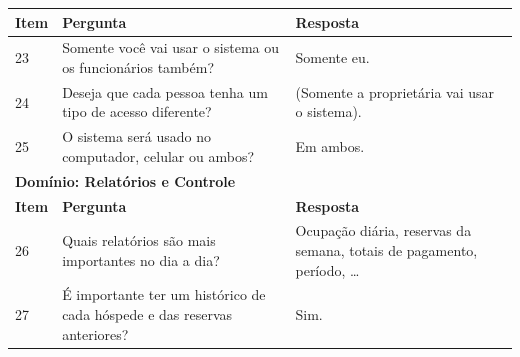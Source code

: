 \documentclass[
	12pt,				%
	openany,			%
	oneside,			%
	a4paper,			%
	english,			%
	french,				%
	spanish,			%
	brazil				%
	]{abntex2}
\begin{document}
\begin{apendicesenv}
\begin{quadro}[H]
\begin{tabular}{|p{1cm}|p{6.5cm}|p{6.5cm}|}
		\hline
		\textbf{Item} & \textbf{Pergunta} & \textbf{Resposta} \\ 
		\hline
		23 & Somente você vai usar o sistema ou os funcionários também? & Somente eu. \\
		\hline
		24 &  Deseja que cada pessoa tenha um tipo de acesso diferente? & (Somente a proprietária vai usar o sistema).\\ 
		\hline
		25 & O sistema será usado no computador, celular ou ambos? & Em ambos. \\ \hline
		\multicolumn{3}{|l|}{\textbf{Domínio: Relatórios e Controle}} \\ \hline
		\textbf{Item} & \textbf{Pergunta} & \textbf{Resposta} \\ \hline
		26 & Quais relatórios são mais importantes no dia a dia? & Ocupação diária, reservas da semana, totais de pagamento, período, …
		\\ \hline
		27 & É importante ter um histórico de cada hóspede e das reservas anteriores? & Sim. \\ 
		\hline
	\end{tabular}
\end{quadro}

\end{apendicesenv}
\end{document}
